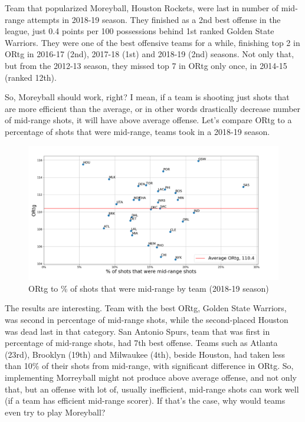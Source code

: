 \documentclass[a4paper]{article}
\begin{document}
Team that popularized Moreyball, Houston Rockets, were last in number of mid-range attempts in 2018-19 season. They finished as a 2nd best offense in the league, just 0.4 points per 100 possessions behind 1st ranked Golden State Warriors. They were one of the best offensive teams for a while, finishing top 2 in ORtg in 2016-17 (2nd), 2017-18 (1st) and 2018-19 (2nd) seasons. Not only that, but from the 2012-13 season, they missed top 7 in ORtg only once, in 2014-15 (ranked 12th).

So, Moreyball should work, right? I mean, if a team is shooting just shots that are more efficient than the average, or in other words drastically decrease number of mid-range shots, it will have above average offense. Let's compare ORtg to a percentage of shots that were mid-range, teams took in a 2018-19 season.

\begin{figure}[h!]
\begin{center}
\includegraphics[scale=0.29]{ortg_pct_mid_range.png}
\end{center}
\caption{ORtg to \% of shots that were mid-range by team (2018-19 season)}
\label{plt:ortg_oct_mid_range}
\end{figure}

The results are interesting. Team with the best ORtg, Golden State Warriors, was second in percentage of mid-range shots, while the second-placed Houston was dead last in that category. San Antonio Spurs, team that was first in percentage of mid-range shots, had 7th best offense. Teams such as Atlanta (23rd), Brooklyn (19th) and Milwaukee (4th), beside Houston, had taken less than 10\% of their shots from mid-range, with significant difference in ORtg. So, implementing Morreyball might not produce above average offense, and not only that, but an offense with lot of, usually inefficient, mid-range shots can work well (if a team has efficient mid-range scorer). If that's the case, why would teams even try to play Moreyball?
\end{document}
